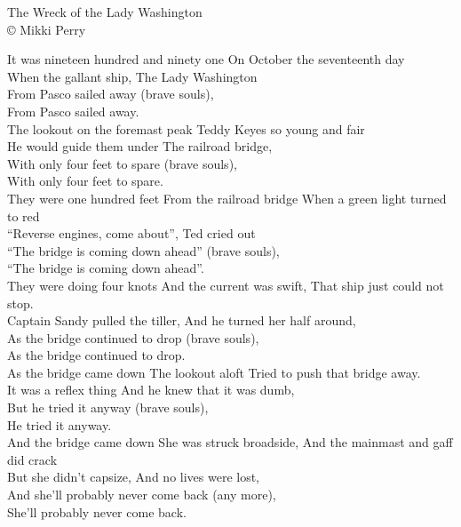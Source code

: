 \documentclass[letterpaper,9pt]{article}
\begin{document}
\newpage
{}
\Huge
The Wreck of the Lady Washington\\

\large
© Mikki Perry

It was nineteen hundred and ninety one On October the seventeenth day \\
When the gallant ship, The Lady Washington \\
From Pasco sailed away (brave souls), \\
From Pasco sailed away. \\

The lookout on the foremast peak Teddy Keyes so young and fair \\
He would guide them under The railroad bridge, \\
With only four feet to spare (brave souls), \\
With only four feet to spare. \\

They were one hundred feet From the railroad bridge When a green light turned to red \\
“Reverse engines, come about”, Ted cried out \\
“The bridge is coming down ahead” (brave souls), \\
“The bridge is coming down ahead”. \\

They were doing four knots And the current was swift, That ship just could not stop. \\
Captain Sandy pulled the tiller, And he turned her half around, \\
As the bridge continued to drop (brave souls), \\
As the bridge continued to drop. \\

As the bridge came down The lookout aloft Tried to push that bridge away. \\
It was a reflex thing And he knew that it was dumb, \\
But he tried it anyway (brave souls), \\
He tried it anyway. \\

And the bridge came down She was struck broadside, And the mainmast and gaff did crack \\
But she didn't capsize, And no lives were lost, \\
And she'll probably never come back (any more), \\
She'll probably never come back. \\
\end{document}

